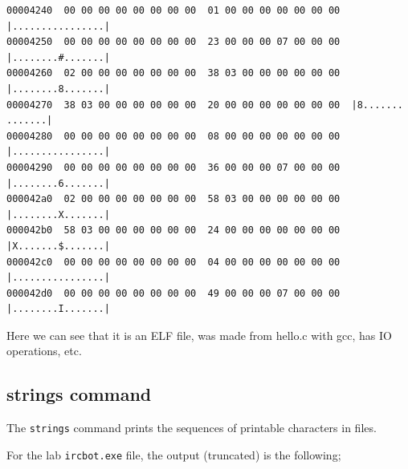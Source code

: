 \documentclass[]{project_plan}
\begin{document}
\begin{lstlisting}[basicstyle=\tiny]
00004240  00 00 00 00 00 00 00 00  01 00 00 00 00 00 00 00  |................|
00004250  00 00 00 00 00 00 00 00  23 00 00 00 07 00 00 00  |........#.......|
00004260  02 00 00 00 00 00 00 00  38 03 00 00 00 00 00 00  |........8.......|
00004270  38 03 00 00 00 00 00 00  20 00 00 00 00 00 00 00  |8....... .......|
00004280  00 00 00 00 00 00 00 00  08 00 00 00 00 00 00 00  |................|
00004290  00 00 00 00 00 00 00 00  36 00 00 00 07 00 00 00  |........6.......|
000042a0  02 00 00 00 00 00 00 00  58 03 00 00 00 00 00 00  |........X.......|
000042b0  58 03 00 00 00 00 00 00  24 00 00 00 00 00 00 00  |X.......$.......|
000042c0  00 00 00 00 00 00 00 00  04 00 00 00 00 00 00 00  |................|
000042d0  00 00 00 00 00 00 00 00  49 00 00 00 07 00 00 00  |........I.......|
\end{lstlisting}

Here we can see that it is an ELF file, was made from hello.c with gcc, has IO operations, etc.

\subsection{strings command}

The \lstinline|strings| command prints the sequences of printable characters in files.

For the lab
\lstinline|ircbot.exe| file, the output (truncated) is the following;
\end{document}
